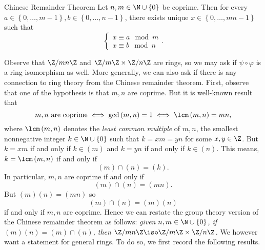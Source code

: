 \documentclass[pmath347]{subfiles}
\begin{document}
    \begin{theorem}{Chinese Remainder Theorem}
        Let $n,m\in\N\cup\left\lbrace 0 \right\rbrace$ be coprime. Then for every $a\in\left\lbrace 0,\ldots,m-1 \right\rbrace , b\in\left\lbrace 0,\ldots,n-1 \right\rbrace$, there exists unique $x\in\left\lbrace 0,\ldots,mn-1 \right\rbrace$ such that
        \begin{equation*}
            \begin{cases} 
                x\equiv a\mod m \\
                x\equiv b\mod n
            \end{cases}.
        \end{equation*}
    \end{theorem}

    \noindent Observe that $\Z /mn\Z$ and $\Z /m\Z\times \Z /n\Z$ are rings, so we may ask if $\psi\circ\varphi$ is a ring isomorphism as well. More generally, we can also ask if there is any connection to ring theory from the Chinese remainder theorem. First, observe that one of the hypothesis is that $m,n$ are coprime. But it is well-known result that
    \begin{equation*}
        m,n\text{ are coprime}\iff\gcd\left( m,n \right) = 1\iff\lcm\left( m,n \right) =mn,
    \end{equation*}
    where $\lcm\left( m,n \right) $ denotes the \textit{least common multiple} of $m,n$, the smallest nonnegative integer $k\in\N\cup\left\lbrace 0 \right\rbrace$ such that $k=xm=yn$ for some $x,y\in\Z$. But $k=xm$ if and only if $k\in\left( m \right)$ and $k=yn$ if and only if $k\in\left( n \right)$. This means, $k=\lcm\left( m,n \right)$ if and only if
    \begin{equation*}
        \left( m \right) \cap \left( n \right) = \left( k \right) .
    \end{equation*}
    In particular, $m,n$ are coprime if and only if
    \begin{equation*}
        \left( m \right) \cap \left( n \right) = \left( mn \right) .
    \end{equation*}
    But $\left( m \right) \left( n \right) = \left( mn \right)$ so
    \begin{equation*}
        \left( m \right) \cap \left( n \right) = \left( m \right)\left( n \right) 
    \end{equation*}
    if and only if $m,n$ are coprime. Hence we can restate the group theory version of the Chinese remainder theorem as follows: \textit{given $n,m\in\N\cup\left\lbrace 0 \right\rbrace$, if $\left( m \right) \left( n \right) = \left( m \right) \cap \left( n \right)$, then $\Z /mn\Z\iso\Z /m\Z\times\Z /n\Z$.} We however want a statement for general rings. To do so, we first record the following results.
\end{document}

